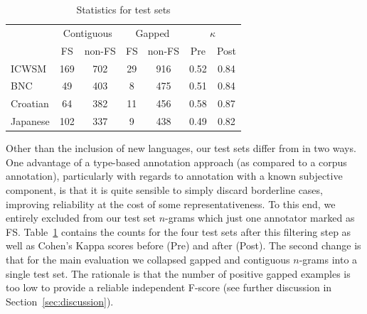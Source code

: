 \documentclass[11pt,letterpaper]{article}
\newcommand{\z}{\phantom{0}}
\newcommand{\tabref}[2][]{Table#1~\ref{#2}\xspace}
\newcommand{\secref}[2][]{Section#1~\ref{#2}\xspace}
\begin{document}
\begin{table}[!bt]
 
 \begin{center}
	 \begin{tabular}{@{}lc@{\,\,\,}cc@{\,\,\,}cc@{\,\,\,}c@{}}

       \toprule
       & \multicolumn{2}{c}{Contiguous} & \multicolumn{2}{c}{Gapped} & \multicolumn{2}{c}{$\kappa$} \\ %
       \cmidrule(lr){2-3}\cmidrule(lr){4-5}\cmidrule(lr){6-7}
			& FS & non-FS & FS & non-FS & Pre & Post \\
			 \midrule
			ICWSM    & 169  & 702 & 29 & 916 &0.52 &0.84 \\
			BNC      & \z49 & 403 & \z8& 475 &0.51 &0.84 \\
			Croatian & \z64 & 382 & 11 & 456 & 0.58 &0.87 \\
			Japanese & 102  & 337 & \z9 & 438 & 0.49 &0.82\\
       \bottomrule
 \end{tabular}
  \caption{ Statistics for test sets }
	 \label{tab:stats}

 \end{center}

 \end{table}

Other than the inclusion of new languages, our test sets differ from  in two ways. One advantage of a type-based annotation approach (as compared to a corpus annotation), particularly with regards to annotation with a known subjective component, is that it is quite sensible to simply discard borderline cases, improving reliability at the cost of some representativeness. To this end, we entirely excluded from our test set $n$-grams which just one annotator marked as FS. \tabref{tab:stats} contains the counts for the four test sets after this filtering step as well as Cohen's Kappa scores before (Pre) and after (Post).  The second change is that for the main evaluation we collapsed gapped and contiguous $n$-grams into a single test set. The rationale is that the number of positive gapped examples is too low to provide a reliable independent F-score (see further discussion in \secref{sec:discussion}). 
\end{document}

